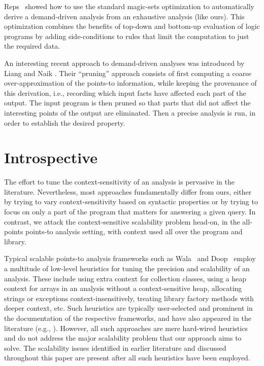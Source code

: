 Reps~\cite{cc:1994:Reps} showed how to use the standard magic-sets
optimization to automatically derive a demand-driven analysis
from an exhaustive analysis (like ours). This optimization
combines the benefits of top-down and bottom-up evaluation of
logic programs by adding side-conditions to rules that limit
the computation to just the required data.

An interesting recent approach to demand-driven analyses was
introduced by Liang and Naik \cite{pldi:2011:Liang}.
Their ``pruning'' approach consists of first computing a coarse
over-approximation of the points-to information, while keeping the
provenance of this derivation, i.e., recording which input facts have
affected each part of the output. The input program is then pruned so
that parts that did not affect the interesting points of the output
are eliminated. Then a precise analysis is run, in order to establish
the desired property.


\section{Introspective}

The effort to tune the context-sensitivity of an analysis is pervasive
in the literature. Nevertheless, most approaches fundamentally differ
from ours, either by trying to vary context-sensitivity based on
syntactic properties or by trying to focus on only a part of the program
that matters for answering a given query.
In contrast, we attack the context-sensitive scalability problem 
head-on, in the all-points points-to analysis setting, with context
used all over the program and library.

Typical scalable points-to analysis frameworks such as
Wala~\cite{www:wala} and Doop~\cite{oopsla:2009:Bravenboer} employ a multitude of
low-level heuristics for tuning the precision and scalability of an
analysis. These include using extra context for collection classes,
using a heap context for arrays in an analysis without a
context-sensitive heap, allocating strings or exceptions
context-insensitively, treating library factory methods with deeper
context, etc. Such heuristics are typically user-selected and
prominent in the documentation of the respective frameworks, and have
also appeared in the literature (e.g.,
\cite{pldi:2009:Tripp,cc:2013:Kastrinis}).  However, all
such approaches are mere hard-wired heuristics and do not address the
major scalability problem that our approach aims to solve. The
scalability issues identified in earlier literature and discussed
throughout this paper are present after all such heuristics have been
employed.

